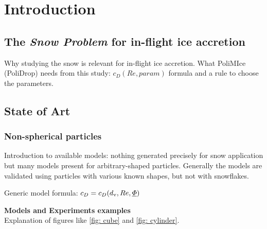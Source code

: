 \documentclass[a4paper,12pt,twoside,titlepage,openright]{book}
\newcommand{\dv}{d_{\textup{v}}}
\begin{document}
	
\frontmatter

\cleardoublepage
%
\cleardoublepage
\tableofcontents
		
\cleardoublepage

\mainmatter
%
%
%

\chapter{Introduction}
\label{sec: intro}

	\section{The \textit{Snow Problem} for in-flight ice accretion}
	\label{sec: SnowProblem}
		Why studying the snow is relevant for in-flight ice accretion. What PoliMIce (PoliDrop) needs from this study: $ c_D(Re, param) $ formula and a rule to choose the parameters.
	
	\section{State of Art}	
	\subsection{Non-spherical particles}
	\label{sec: NonSphericalParticles}
		Introduction to available models: nothing generated precisely for snow application but many models present for arbitrary-shaped particles. Generally the models are validated using particles with various known shapes, but not with snowflakes.
	
		Generic model formula: $ c_D = c_D(\dv, Re, \underline{\varPhi}) $
			
		\textbf{Models and Experiments examples}\\
		Explanation of figures like \ref{fig: cube} and \ref{fig: cylinder}.
		
\end{document}

